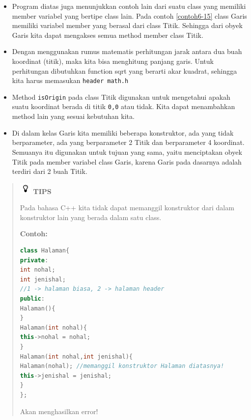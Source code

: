 \begin{itemize}

\item
  Program diatas juga menunjukkan contoh lain dari suatu class yang
  memiliki member variabel yang bertipe class lain. Pada contoh \ref{contoh6-15}
  class Garis memiliki variabel member yang berasal dari class Titik.
  Sehingga dari obyek Garis kita dapat mengakses semua method member
  class Titik.
\item
  Dengan menggunakan rumus matematis perhitungan jarak antara dua buah
  koordinat (titik), maka kita bisa menghitung panjang garis. Untuk
  perhitungan dibutuhkan function sqrt yang berarti akar kuadrat,
  sehingga kita harus memasukan \texttt{header\ math.h}
\item
  Method \texttt{isOrigin} pada class Titik digunakan untuk mengetahui
  apakah suatu koordinat berada di titik \texttt{0,0} atau tidak. Kita
  dapat menambahkan method lain yang sesuai kebutuhan kita.
\item
  Di dalam kelas Garis kita memiliki beberapa konstruktor, ada yang
  tidak berparameter, ada yang berparameter 2 Titik dan berparameter 4
  koordinat. Semuanya itu digunakan untuk tujuan yang sama, yaitu
  menciptakan obyek Titik pada member variabel class Garis, karena Garis
  pada dasarnya adalah terdiri dari 2 buah Titik.
\end{itemize}

\begin{quotation}
\includegraphics{../manuscript/images/tips.png} \textbf{TIPS} 
	
Pada bahasa C++ kita tidak dapat memanggil konstruktor dari dalam konstruktor
lain yang berada dalam satu class.
	
\textbf{Contoh:}
	
\begin{lstlisting}[language=c++, numbers=none]
class Halaman{
private:
int nohal;
int jenishal;
//1 -> halaman biasa, 2 -> halaman header
public:
Halaman(){
}
Halaman(int nohal){
this->nohal = nohal;
}
Halaman(int nohal,int jenishal){
Halaman(nohal); //memanggil konstruktor Halaman diatasnya!
this->jenishal = jenishal;
}
};
\end{lstlisting}
	
 Akan menghasilkan error!
\end{quotation}

